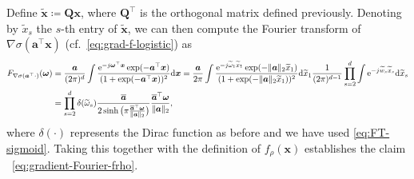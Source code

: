 \documentclass[english]{article}
\begin{document}
Define $\widetilde{\bm x} \coloneqq {\bm Q}{\bm x}$, where ${\bm Q}^{\top}$ is the orthogonal matrix defined previously.
Denoting by $\widetilde{x}_s$ the $s$-th entry of $\widetilde{\bm{x}}$, we can then compute the Fourier transform of $\nabla  \sigma({\bm a}^{\top}{\bm x})$ (cf.~\eqref{eq:grad-f-logistic}) as 
%
\begin{align*}
F_{\nabla \sigma({\bm a}^{\top}\cdot)}({\bm \omega}) &=\frac{{\bm a}}{(2\pi)^d}\int \frac{{\rm e}^{-j{\bm \omega}^{\top}{\bm x}}\exp(-{\bm a}^{\top}{\bm x})}{(1+\exp(-{\bm a}^{\top}{\bm x}))^2}\mathrm{d}{\bm x} 
=\frac{{\bm a}}{2\pi}\int \frac{{\rm e}^{-j\widetilde{\omega}_1\widetilde{x}_1}\exp(-\|{\bm a}\|_2\widetilde{x}_1)}{(1+\exp(-\|{\bm a}\|_2\widetilde{x}_1))^2}\mathrm{d} \widetilde{x}_1 \frac{1}{(2\pi)^{d-1}}\prod_{s=2}^d\int {\rm e}^{-j\widetilde{w}_s\widetilde{x}_s}\mathrm{d} \widetilde{x}_s\notag\\
&=\prod_{s=2}^d\delta(\widetilde{\omega}_s)\frac{\overline{\bm a}}{2\sinh\big(\pi\frac{\overline{\bm a}^{\top}{\bm \omega}}{\|{\bm a}\|_2}\big)}\frac{\overline{\bm a}^{\top}{\bm \omega}}{\|{\bm a}\|_2},
\end{align*}
%
where $\delta(\cdot)$ represents the Dirac function as before and we have used \eqref{eq:FT-sigmoid}. 
Taking this together with the definition of $f_{\rho}({\bm x})$ establishes the claim ~\eqref{eq:gradient-Fourier-frho}.

\end{document}
